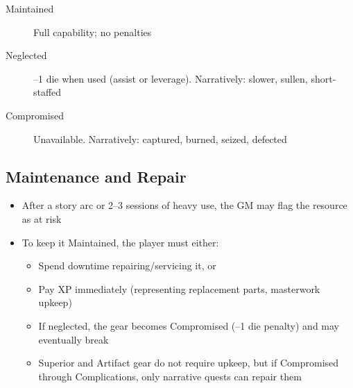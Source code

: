 \begin{description}
\item[Maintained] Full capability; no penalties
\item[Neglected] --1 die when used (assist or leverage). Narratively: slower, sullen, short-staffed
\item[Compromised] Unavailable. Narratively: captured, burned, seized, defected
\end{description}

\subsection{Maintenance and Repair}

\begin{itemize}
\item After a story arc or 2--3 sessions of heavy use, the GM may flag the resource as at risk
\item To keep it Maintained, the player must either:
  \begin{itemize}
  \item Spend downtime repairing/servicing it, or
  \item Pay XP immediately (representing replacement parts, masterwork upkeep)
  \item If neglected, the gear becomes Compromised (--1 die penalty) and may eventually break
  \item Superior and Artifact gear do not require upkeep, but if Compromised through Complications, only narrative quests can repair them
  \end{itemize}
\end{itemize}
